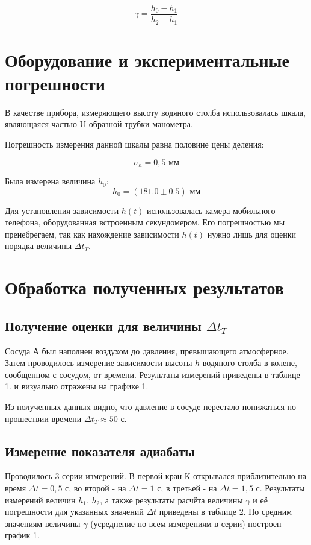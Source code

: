 \documentclass[15pt,a5paper,reqno]{article}
\begin{document}
	\begin{equation}
	    \gamma = \frac{h_0 - h_1}{h_2 - h_1}
	\end{equation}
	
\section{Оборудование и экспериментальные погрешности}

    В качестве прибора, измеряющего высоту водяного столба использовалась шкала, являющаяся частью U-образной трубки манометра.
    
    \noindent Погрешность измерения данной шкалы равна половине цены деления:
    
    \[\sigma_{h} = 0,5\text{ мм}\]
    
    \noindent Была измерена величина $h_0$:
    \[h_0 = (181.0 \pm 0.5)\text{ мм}\]
    
    Для установления зависимости $h(t)$ использовалась камера мобильного телефона, оборудованная встроенным секундомером. Его погрешностью мы пренебрегаем, так как нахождение зависимости $h(t)$ нужно лишь для оценки порядка величины $\Delta t_T$.
	
\section{Обработка полученных результатов}

    \subsection{Получение оценки для величины $\Delta t_T$}
    
    Сосуда А был наполнен воздухом до давления, превышающего атмосферное. Затем проводилось измерение зависимости высоты $h$ водяного столба в колене, сообщенном с сосудом, от времени. Результаты измерений приведены в таблице 1. и визуально отражены на графике 1. 
    
    Из полученных данных видно, что давление в сосуде перестало понижаться по прошествии времени $\Delta t_T \approx 50\text{ с}$.
    
    \subsection{Измерение показателя адиабаты}
    
    Проводилось 3 серии измерений. В первой кран К открывался приблизительно на время $\Delta t = 0,5$ с, во второй - на $\Delta t = 1$ с, в третьей - на $\Delta t = 1,5$ с. Результаты измерений величин $h_1$, $h_2$, а также результаты расчёта величины $\gamma$ и её погрешности для указанных значений $\Delta t$ приведены в таблице 2. По средним значениям величины $\gamma$ (усреднение по всем измерениям в серии) построен график 1.
    
\end{document}
